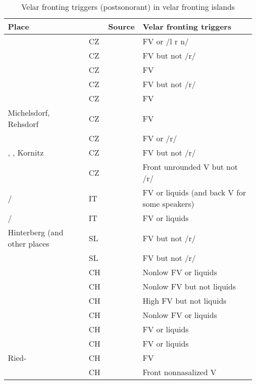 \begin{table}
\small
\caption{\label{tab:15.9}Velar fronting triggers (postsonorant) in velar fronting islands}
\begin{tabularx}{\textwidth}{Q@{~}llQ}
\lsptoprule
Place &  & Source & Velar fronting triggers\\
\midrule
{} & CZ & \citet{Weinelt1940} & FV or /l r n/\\
 & CZ & \citet{Stolle1969} & FV but not /r/\\
 & CZ & \citet{Seemüller1980c} & FV\\
 & CZ & \citet{Janiczek1911} & FV but not /r/\\
 & CZ & \citet{Graebisch1915} & FV\\
Michelsdorf, Rehsdorf & CZ & \citet{Benesch1979} & FV \\
 & CZ & \citet{Benesch1979} & FV or /r/\\
, , Kornitz & CZ & \citet{Benesch1979} & FV but not /r/\\
 & CZ & \citet{Benesch1979} & Front unrounded V but not /r/\\
\slash {} & IT & \citet{Schweizer1939} & FV or liquids (and back V for some speakers)\\
\slash {} & IT & \citet{Mayer1971} & FV or liquids\\
Hinterberg (and other places & SL & \citet{Lipold1984} & FV but not /r/\\
 & SL & \citet{Seemüller1909d} & FV but not /r/\\
 & CH & \citet{Gröger1914b} & Nonlow FV or liquids\\
 & CH & \citet{Brun1918} & Nonlow FV but not liquids\\
 & CH & \citet{Wipf1910} & High FV but not liquids\\
 & CH & \citet{Henzen1928} & Nonlow FV or liquids\\
 & CH & \citet{Rübel1950} & FV or liquids\\
 & CH & \citet{Schmid1969} & FV or liquids\\
Ried- & CH & \citet{Werlen1977} & FV \\
 & CH & \citet{Zahler1901} & Front nonnasalized V\\

\end{tabularx}
\end{table}
